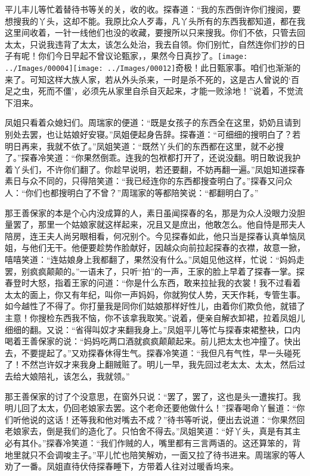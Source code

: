 平儿丰儿等忙着替待书等关的关，收的收。探春道：``我的东西倒许你们搜阅，要想搜我的丫头，这却不能。我原比众人歹毒，凡丫头所有的东西我都知道，都在我这里间收着，一针一线他们也没的收藏，要搜所以只来搜我。你们不依，只管去回太太，只说我违背了太太，该怎么处治，我去自领。你们别忙，自然连你们抄的日子有呢！你们今日早起不曾议论甄家，，果然今日真抄了。{\texttt{[image: ../Images/00004]}\texttt{[image: ../Images/00012]}\footnotesize \kaishu 奇极！此日甄家事。}咱们也渐渐的来了。可知这样大族人家，若从外头杀来，一时是杀不死的，这是古人曾说的`百足之虫，死而不僵'，必须先从家里自杀自灭起来，才能一败涂地！''说着，不觉流下泪来。

凤姐只看着众媳妇们。周瑞家的便道：``既是女孩子的东西全在这里，奶奶且请到别处去罢，也让姑娘好安寝。''凤姐便起身告辞。探春道：``可细细的搜明白了？若明日再来，我就不依了。''凤姐笑道：``既然丫头们的东西都在这里，就不必搜了。''探春冷笑道：``你果然倒乖。连我的包袱都打开了，还说没翻。明日敢说我护着丫头们，不许你们翻了。你趁早说明，若还要翻，不妨再翻一遍。''凤姐知道探春素日与众不同的，只得陪笑道：``我已经连你的东西都搜查明白了。''探春又问众人：``你们也都搜明白了不曾？''周瑞家的等都陪笑说：``都翻明白了。''

那王善保家的本是个心内没成算的人，素日虽闻探春的名，那是为众人没眼力没胆量罢了，那里一个姑娘家就这样起来，况且又是庶出，他敢怎么。他自恃是邢夫人陪房，连王夫人尚另眼相看，何况别个。今见探春如此，他只当是探春认真单恼凤姐，与他们无干。他便要趁势作脸献好，因越众向前拉起探春的衣襟，故意一掀，嘻嘻笑道：``连姑娘身上我都翻了，果然没有什么。''凤姐见他这样，忙说：``妈妈走罢，别疯疯颠颠的。''一语未了，只听``拍''的一声，王家的脸上早着了探春一掌。探春登时大怒，指着王家的问道：``你是什么东西，敢来拉扯我的衣裳！我不过看着太太的面上，你又有年纪，叫你一声妈妈，你就狗仗人势，天天作耗，专管生事。如今越性了不得了。你打量我是同你们姑娘那样好性儿，由着你们欺负他，就错了主意！你搜检东西我不恼，你不该拿我取笑。''说着，便亲自解衣卸裙，拉着凤姐儿细细的翻。又说：``省得叫奴才来翻我身上。''凤姐平儿等忙与探春束裙整袂，口内喝着王善保家的说：``妈妈吃两口酒就疯疯颠颠起来。前儿把太太也冲撞了。快出去，不要提起了。''又劝探春休得生气。探春冷笑道：``我但凡有气性，早一头碰死了！不然岂许奴才来我身上翻贼赃了。明儿一早，我先回过老太太、太太，然后过去给大娘陪礼，该怎么，我就领。''

那王善保家的讨了个没意思，在窗外只说：``罢了，罢了，这也是头一遭挨打。我明儿回了太太，仍回老娘家去罢。这个老命还要他做什么！''探春喝命丫鬟道：``你们听他说的这话！还等我和他对嘴去不成？''待书等听说，便出去说道：``你果然回老娘家去，倒是我们的造化了。只怕舍不得去。''凤姐笑道：``好丫头，真是有其主必有其仆。''探春冷笑道：``我们作贼的人，嘴里都有三言两语的。这还算笨的，背地里就只不会调唆主子。''平儿忙也陪笑解劝，一面又拉了待书进来。周瑞家的等人劝了一番。凤姐直待伏侍探春睡下，方带着人往对过暖香坞来。

